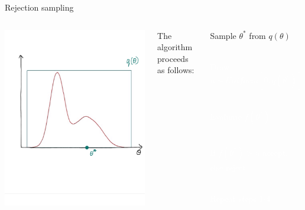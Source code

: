 \documentclass[compress]{beamer}
\begin{document}
\begin{frame}[label=sec-5-4]{Rejection sampling}
\begin{columns}[c] 
\includegraphics[width=1\linewidth]{RS3}

The algorithm proceeds as follows:\\
\begin{enumerate}
\item Sample $\theta^*$ from $q(\theta)$ \\~\\
\textcolor{white}{
\item[\color{white}] Draw $u \sim Uniform[0, q(\theta^*)]$ \\~\\
\item[\color{white}] Evaluate $f(\theta^*)$ \\~\\
\item[\color{white}] If $f(\theta^*) > u$ accept, else reject \\~\\
\item[\color{white}] Repeat steps 1-4
}
\end{enumerate}
\end{columns}
\end{frame}
\end{document}
